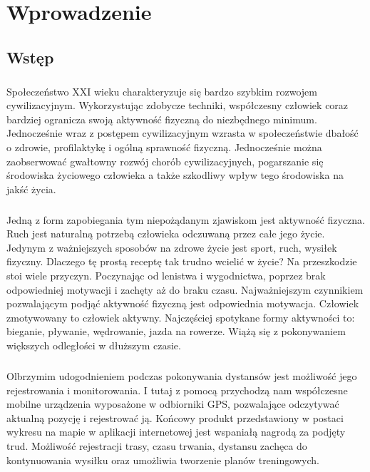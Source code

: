 \chapter{Wprowadzenie}

\section{Wstęp} %
\label{sec:wst_p}
\paragraph{} %
\label{par:}

Społeczeństwo XXI wieku charakteryzuje się bardzo szybkim rozwojem cywilizacyjnym.
Wykorzystując zdobycze techniki, współczesny człowiek coraz bardziej ogranicza swoją aktywność fizyczną do niezbędnego minimum. Jednocześnie wraz z postępem cywilizacyjnym wzrasta w społeczeństwie dbałość o zdrowie, profilaktykę i ogólną sprawność fizyczną. Jednocześnie można zaobserwować gwałtowny rozwój chorób cywilizacyjnych, pogarszanie się środowiska życiowego człowieka a także szkodliwy wpływ tego środowiska na jakść życia.

\paragraph{} %
\label{par:}
Jedną z form zapobiegania tym niepożądanym zjawiskom jest aktywność fizyczna. Ruch jest naturalną potrzebą człowieka odczuwaną przez całe jego życie. Jedynym z ważniejszych sposobów na zdrowe życie jest sport, ruch, wysiłek fizyczny. 
Dlaczego tę prostą receptę tak trudno wcielić w życie? Na przeszkodzie stoi wiele przyczyn. Poczynając od lenistwa i wygodnictwa, poprzez brak odpowiedniej motywacji i zachęty aż do braku czasu.
Najważniejszym czynnikiem pozwalającym podjąć aktywność fizyczną jest odpowiednia motywacja. Człowiek zmotywowany to człowiek aktywny. 
Najczęściej spotykane formy aktywności to: bieganie, pływanie, wędrowanie, jazda na rowerze. Wiążą się z pokonywaniem większych odległości w dłuższym czasie.


\paragraph{} %
 \label{par:} 
Olbrzymim udogodnieniem podczas pokonywania dystansów jest możliwość jego rejestrowania i monitorowania. I tutaj z pomocą przychodzą nam współczesne mobilne urządzenia wyposażone w odbiorniki GPS, pozwalające odczytywać aktualną pozycję i rejestrować ją. Końcowy produkt przedstawiony w postaci wykresu na mapie w aplikacji internetowej jest wspaniałą nagrodą za podjęty trud. Możliwość rejestracji trasy, czasu trwania, dystansu zachęca do kontynuowania wysiłku oraz umożliwia tworzenie planów treningowych.

